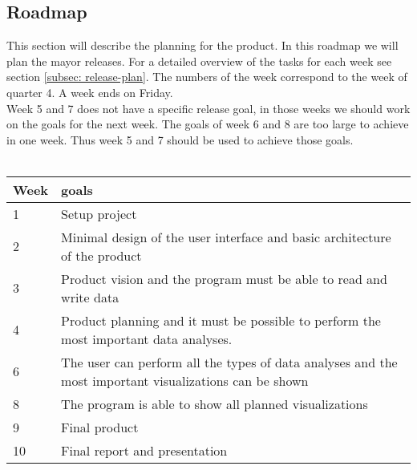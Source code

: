 \subsection{Roadmap}
\label{subsec: roadmap}
This section will describe the planning for the product. In this roadmap we will plan the mayor releases. For a detailed overview of the tasks for each week see section \ref{subsec: release-plan}. The numbers of the week correspond to the week of quarter 4. A week ends on Friday.\\
Week 5 and 7 does not have a specific release goal, in those weeks we should work on the goals for the next week. The goals of week 6 and 8 are too large to achieve in one week. Thus week 5 and 7 should be used to achieve those goals.\\\\
\begin{tabular}[H]{ l p{10cm} }
Week & goals \\
\hline
1 & Setup project \\
2 & Minimal design of the user interface and basic architecture of the product \\
3 & Product vision and the program must be able to read and write data\\
4 & Product planning and it must be possible to perform the most important data analyses. \\
6 & The user can perform all the types of data analyses and the most important visualizations can be shown \\
8 & The program is able to show all planned visualizations \\
9 & Final product \\
10 & Final report and presentation
\end{tabular}
